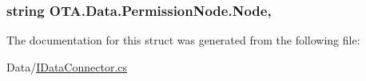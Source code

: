 \subsubsection[{Node}]{\setlength{\rightskip}{0pt plus 5cm}string O\+T\+A.\+Data.\+Permission\+Node.\+Node\hspace{0.3cm}{\ttfamily [get]}, {\ttfamily [set]}}\label{struct_o_t_a_1_1_data_1_1_permission_node_aa9694d82e9aaeecb9426adeb134481e6}


The documentation for this struct was generated from the following file\+:\begin{DoxyCompactItemize}
\item 
Data/\hyperlink{_i_data_connector_8cs}{I\+Data\+Connector.\+cs}\end{DoxyCompactItemize}
